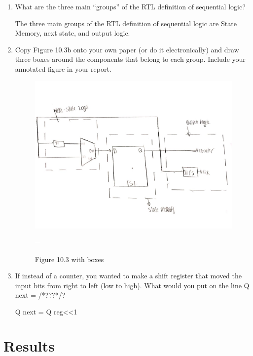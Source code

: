 \documentclass[11pt]{article}
\begin{document}
\begin{enumerate}
	
	
	\item  What are the three main “groups” of the RTL deﬁnition of sequential logic?
	
	The three main groups of the RTL definition of sequential logic are State Memory, next state, and output logic.
	
	
	\item  Copy Figure 10.3b onto your own paper (or do it electronically) and draw three boxes around the components that belong to each group. Include your annotated ﬁgure in your report.
	
	\begin{figure}[ht]\centering
		
		\includegraphics[width=1.0\textwidth]{10.3}
		\caption{Figure 10.3 with boxes}
		\label{fig:sim_with_table}=
	\end{figure}
\clearpage
	
	\item If instead of a counter, you wanted to make a shift register that moved the input bits from right to left (low to high). What would you put on the line Q next = /*???*/?
	
	Q next = Q reg<<1
	
\end{enumerate}











\section*{Results}
\end{document}
